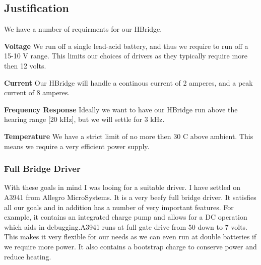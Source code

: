 \documentclass[12pt]{article}
\begin{document}
\subsection{Justification}
We have a number of requirments for our HBridge.
\begin{description}
\item{\bf Voltage} We run off a single lead-acid battery, and thus we require to run off a 15-10 V range. This limits our choices of drivers as they typically require more then 12 volts.
\item{\bf Current} Our HBridge will handle a continous current of 2 amperes, and a peak current of 8 amperes.
\item{\bf Frequency Response} Ideally we want to have our HBridge run above the hearing range [20 kHz], but we will settle for 3 kHz.
\item{\bf Temperature} We have a strict limit of no more then 30 C above ambient. This means we require a very efficient power supply.
\end{description}
\subsubsection{Full Bridge Driver}
With these goals in mind I was looing for a suitable driver. I have settled on A3941 from Allegro MicroSystems. It is a very beefy full bridge driver. It satisfies all our goals and in addition has a number of very important features. For example, it contains an integrated charge pump and allows for a DC operation which aids in debugging.A3941 runs at full gate drive from 50 down to 7 volts. This makes it very flexible for our needs as we can even run at double batteries if we require more power.  It also contains a bootstrap charge to conserve power and reduce heating.
\end{document}
